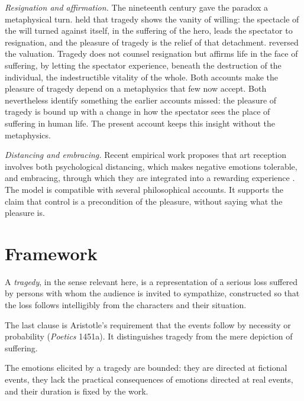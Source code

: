 \documentclass{situationist-preprint}
\begin{document}
\emph{Resignation and affirmation.} The nineteenth century gave the paradox a metaphysical turn. \citet{Schopenhauer1819} held that tragedy shows the vanity of willing: the spectacle of the will turned against itself, in the suffering of the hero, leads the spectator to resignation, and the pleasure of tragedy is the relief of that detachment. \citet{Nietzsche1872} reversed the valuation. Tragedy does not counsel resignation but affirms life in the face of suffering, by letting the spectator experience, beneath the destruction of the individual, the indestructible vitality of the whole. Both accounts make the pleasure of tragedy depend on a metaphysics that few now accept. Both nevertheless identify something the earlier accounts missed: the pleasure of tragedy is bound up with a change in how the spectator sees the place of suffering in human life. The present account keeps this insight without the metaphysics.

\emph{Distancing and embracing.} Recent empirical work proposes that art reception involves both psychological distancing, which makes negative emotions tolerable, and embracing, through which they are integrated into a rewarding experience \citep{MenninghausEtAl2017}. The model is compatible with several philosophical accounts. It supports the claim that control is a precondition of the pleasure, without saying what the pleasure is.

\section{Framework}

\begin{definition}\label{d:tragedy}
A \emph{tragedy}, in the sense relevant here, is a representation of a serious loss suffered by persons with whom the audience is invited to sympathize, constructed so that the loss follows intelligibly from the characters and their situation.
\end{definition}

The last clause is Aristotle's requirement that the events follow by necessity or probability (\emph{Poetics} 1451a). It distinguishes tragedy from the mere depiction of suffering.

\begin{principle}[Control]\label{p:control}
The emotions elicited by a tragedy are bounded: they are directed at fictional events, they lack the practical consequences of emotions directed at real events, and their duration is fixed by the work.
\end{principle}
\end{document}
